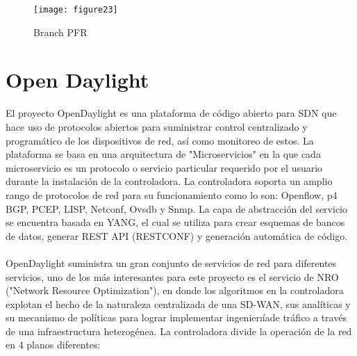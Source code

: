 \begin{figure}[htbp]
  \centering
    {\texttt{[image: figure23]}}%
  \caption{Branch PFR}
  \label{fig:fig2subfig}
\end{figure}
\section{Open Daylight}
\label{sec:Open Daylight}

El proyecto OpenDaylight es una plataforma de código abierto para SDN que hace
uso de protocolos abiertos para suministrar control centralizado y programático de los
dispositivos de red, así como monitoreo de estos. La plataforma se basa en una arquitectura de "Microservicios" en la que cada microservicio es un protocolo o servicio particular requerido por el usuario durante la instalación de la controladora. La controladora soporta un amplio rango de protocolos de red para su funcionamiento como lo son: Openflow, p4 BGP, PCEP, LISP, Netconf, Ovsdb y Snmp. La capa de abstracción
del servicio se encuentra basada en YANG, el cual se utiliza para crear esquemas de bancos de datos, generar REST API (RESTCONF) y generación automática de código.
\\
\\
OpenDaylight suministra un gran conjunto de servicios de red para diferentes servicios, uno de los más interesantes para este proyecto es el servicio de NRO ("Network Resource Optimization"), en donde los algoritmos en la controladora explotan el hecho de la naturaleza centralizada de una SD-WAN, sus analíticas y su mecanismo de políticas para lograr implementar ingenierıíade tráfico a través de una infraestructura
heterogénea. La controladora divide la operación de la red en 4 planos diferentes:

